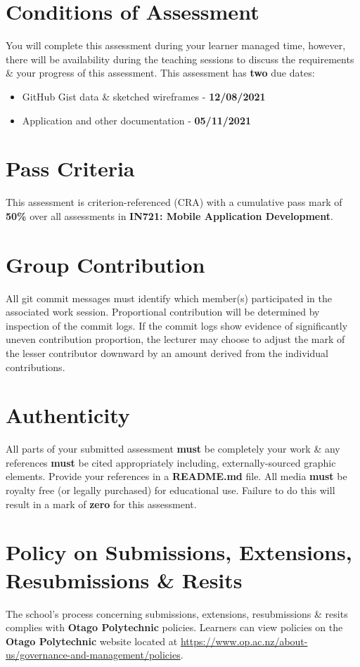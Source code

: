 \documentclass{article}
\begin{document}
\section*{Conditions of Assessment}
You will complete this assessment during your learner managed time, however, there will be availability during the teaching sessions to discuss the requirements \& your progress of this assessment. This assessment has \textbf{two} due dates:
\begin{itemize}
	\item GitHub Gist data \& sketched wireframes - \textbf{12/08/2021}
	\item Application and other documentation - \textbf{05/11/2021}
\end{itemize}

\section*{Pass Criteria}
This assessment is criterion-referenced (CRA) with a cumulative pass mark of \textbf{50\%} over all assessments in \textbf{IN721: Mobile Application Development}.

\section*{Group Contribution}
All git commit messages must identify which member(s) participated in the associated work session. Proportional contribution will be determined by inspection of the commit logs. If the commit logs show evidence of significantly uneven contribution proportion, the lecturer may choose to adjust the mark of the lesser contributor downward by an amount derived from the individual contributions.

\section*{Authenticity}
All parts of your submitted assessment \textbf{must} be completely your work \& any references \textbf{must} be cited appropriately including, externally-sourced graphic elements. Provide your references in a \textbf{README.md} file. All media \textbf{must} be royalty free (or legally purchased) for educational use. Failure to do this will result in a mark of \textbf{zero} for this assessment.

\section*{Policy on Submissions, Extensions, Resubmissions \& Resits}
The school's process concerning submissions, extensions, resubmissions \& resits complies with \textbf{Otago Polytechnic} policies. Learners can view policies on the \textbf{Otago Polytechnic} website located at \href{https://www.op.ac.nz/about-us/governance-and-management/policies}{https://www.op.ac.nz/about-us/governance-and-management/policies}.
\end{document}
